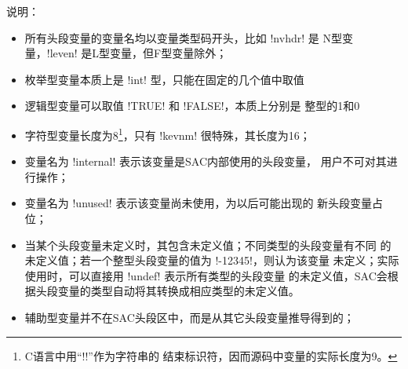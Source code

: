 说明：
\begin{itemize}
\item 所有头段变量的变量名均以变量类型码开头，比如 !nvhdr! 是
    N型变量，!leven! 是L型变量，但F型变量除外；
\item 枚举型变量本质上是 !int! 型，只能在固定的几个值中取值
\item 逻辑型变量可以取值 !TRUE! 和 !FALSE!，本质上分别是
    整型的1和0
\item 字符型变量长度为8\footnote{C语言中用``!\0!''作为字符串的
    结束标识符，因而源码中变量的实际长度为9。}，只有 !kevnm!
    很特殊，其长度为16；
\item 变量名为 !internal! 表示该变量是SAC内部使用的头段变量，
    用户不可对其进行操作；
\item 变量名为 !unused! 表示该变量尚未使用，为以后可能出现的
    新头段变量占位；
\item 当某个头段变量未定义时，其包含未定义值；不同类型的头段变量有不同
    的未定义值；若一个整型头段变量的值为 !-12345!，则认为该变量
    未定义；实际使用时，可以直接用 !undef! 表示所有类型的头段变量
    的未定义值，SAC会根据头段变量的类型自动将其转换成相应类型的未定义值。
\item 辅助型变量并不在SAC头段区中，而是从其它头段变量推导得到的；
\end{itemize}
